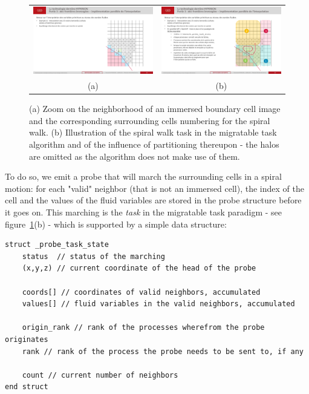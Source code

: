 \begin{figure}[ht!]
    \centering
    \begin{tabular}{cc}
        \includegraphics[width=0.35\linewidth]{chapter3_numerical_methods/pictures/BC_migrable1.pdf} &
        \includegraphics[width=0.35\linewidth]{chapter3_numerical_methods/pictures/BC_migrable2.pdf} \\ [0.5em]
        (a) & (b)
    \end{tabular}
    \caption{(a) Zoom on the neighborhood of an immersed boundary cell image and the corresponding surrounding cells numbering for the spiral walk.
    (b) Illustration of the spiral walk task in the migratable task algorithm and of the influence of partitioning thereupon - the halos are omitted as the algorithm does not make use of them.}
    \label{fig:migratable_task}
\end{figure}

To do so, we emit a probe that will march the surrounding cells in a spiral motion: for each "valid" neighbor (that is not an immersed cell), the index of the cell and the values of the fluid variables are stored in the probe structure before it goes on.
This marching is the \emph{task} in the migratable task paradigm - see figure~\ref{fig:migratable_task}(b) - which is supported by a simple data structure:

\begin{verbatim}
struct _probe_task_state
    status  // status of the marching
    (x,y,z) // current coordinate of the head of the probe

    coords[] // coordinates of valid neighbors, accumulated
    values[] // fluid variables in the valid neighbors, accumulated

    origin_rank // rank of the processes wherefrom the probe originates
    rank // rank of the process the probe needs to be sent to, if any

    count // current number of neighbors
end struct
\end{verbatim}


